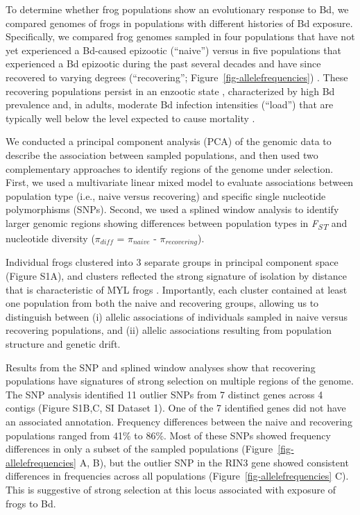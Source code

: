 \documentclass[9pt,twocolumn,twoside,lineno]{pnas-new}
\begin{document}
To determine whether frog populations show an evolutionary response to
Bd, we compared genomes of frogs in populations with different histories
of Bd exposure. Specifically, we compared frog genomes sampled in four
populations that have not yet experienced a Bd-caused epizootic
(``naive'') \citep{zhou2015} versus in five populations that experienced
a Bd epizootic during the past several decades and have since recovered
to varying degrees (``recovering''; Figure~\ref{fig-allelefrequencies})
\citep{knapp2016, vredenburg2010}. These recovering populations persist
in an enzootic state \citep{briggs2010}, characterized by high Bd
prevalence and, in adults, moderate Bd infection intensities (``load'')
that are typically well below the level expected to cause mortality
\citep{vredenburg2010}.

We conducted a principal component analysis (PCA) of the genomic data to
describe the association between sampled populations, and then used two
complementary approaches to identify regions of the genome under
selection. First, we used a multivariate linear mixed model to evaluate
associations between population type (i.e., naive versus recovering) and
specific single nucleotide polymorphisms (SNPs). Second, we used a
splined window analysis to identify larger genomic regions showing
differences between population types in \emph{F\textsubscript{ST}} and
nucleotide diversity (\(\pi_{diff}\) = \(\pi_{naive}\) -
\(\pi_{recovering}\)).

Individual frogs clustered into 3 separate groups in principal component
space (Figure S1A), and clusters reflected
the strong signature of isolation by distance that is characteristic of
MYL frogs \citep{rothstein2020, poorten2017}. Importantly, each cluster
contained at least one population from both the naive and recovering
groups, allowing us to distinguish between (i) allelic associations of
individuals sampled in naive versus recovering populations, and (ii)
allelic associations resulting from population structure and genetic
drift.

Results from the SNP and splined window analyses show that recovering
populations have signatures of strong selection on multiple regions of
the genome. The SNP analysis identified 11 outlier SNPs from 7 distinct
genes across 4 contigs (Figure S1B,C, SI
Dataset 1). One of the 7 identified genes did not have an associated
annotation. Frequency differences between the naive and recovering
populations ranged from 41\% to 86\%. Most of these SNPs showed
frequency differences in only a subset of the sampled populations
(Figure~\ref{fig-allelefrequencies} A, B), but the outlier SNP in the
RIN3 gene showed consistent differences in frequencies across all
populations (Figure~\ref{fig-allelefrequencies} C). This is suggestive
of strong selection at this locus associated with exposure of frogs to
Bd.
\end{document}
